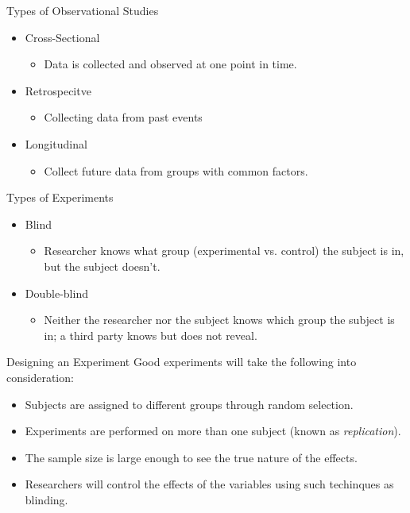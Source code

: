 \documentclass[t]{beamer}
\begin{document}
\begin{frame}{Types of Observational Studies}
\begin{itemize}
	\item Cross-Sectional
		\begin{itemize}
		\item<+-> Data is collected and observed at one point in time. 
		\end{itemize}
	\item<+-> Retrospecitve
		\begin{itemize}
		\item<+-> Collecting data from past events 
		\end{itemize}
	\item<+-> Longitudinal
		\begin{itemize}
		\item<+-> Collect future data from groups with common factors.
		\end{itemize}
\end{itemize}
\end{frame}

\begin{frame}{Types of Experiments}
\begin{itemize}
	\item Blind
	\begin{itemize}
		\item<+-> Researcher knows what group (experimental vs. control) the subject is in, but the subject doesn't.
	\end{itemize}
	\item Double-blind
	\begin{itemize}
		\item<+-> Neither the researcher nor the subject knows which group the subject is in; a third party knows but does not reveal. 
	\end{itemize}
\end{itemize}
\end{frame}

\begin{frame}{Designing an Experiment}
Good experiments will take the following into consideration:
\begin{itemize}
	\item<+-> Subjects are assigned to different groups through random selection.
	\item<+-> Experiments are performed on more than one subject (known as \textit{replication}).
	\item<+-> The sample size is large enough to see the true nature of the effects.
	\item<+-> Researchers will control the effects of the variables using such techinques as blinding.
\end{itemize}
\end{frame}
\end{document}
